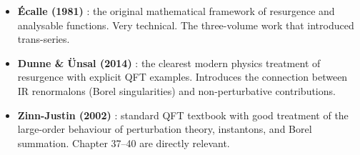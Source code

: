 \documentclass[11pt,a4paper]{article}
\theoremstyle{definition}
\begin{document}
\begin{itemize}[leftmargin=2em]
  \item \textbf{\'Ecalle (1981)} \cite{ecalle1981}: the original mathematical
        framework of resurgence and analysable functions. Very technical.
        The three-volume work that introduced trans-series.

  \item \textbf{Dunne \& \"Unsal (2014)} \cite{dunne2014}: the clearest modern
        physics treatment of resurgence with explicit QFT examples. Introduces
        the connection between IR renormalons (Borel singularities) and
        non-perturbative contributions.

  \item \textbf{Zinn-Justin (2002)} \cite{zinjustin2002}: standard QFT textbook
        with good treatment of the large-order behaviour of perturbation theory,
        instantons, and Borel summation. Chapter 37--40 are directly relevant.
\end{itemize}
\end{document}
